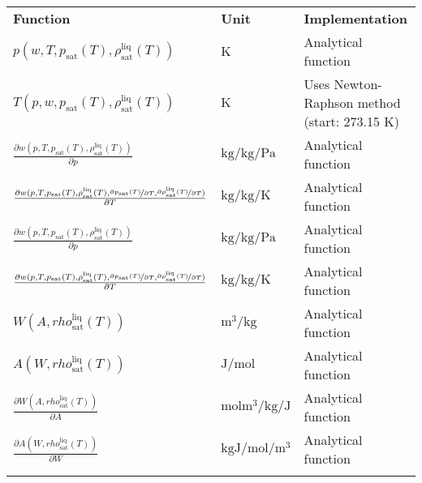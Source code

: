 \begin{longtable}[l]{l|l|p{4cm}}
	\toprule
	\addlinespace
	\textbf{Function} & \textbf{Unit} &	\textbf{Implementation} \\
	\addlinespace
	\midrule
	\endhead
	
	\bottomrule
	\endfoot
	\bottomrule
	\endlastfoot
	\addlinespace
	
	$p(w,T,p_\mathrm{sat}(T),\rho_\mathrm{sat}^\mathrm{liq}(T))$	& $\si{\kelvin}$ & Analytical function\\
	$T(p,w,p_\mathrm{sat}(T),\rho_\mathrm{sat}^\mathrm{liq}(T))$	& $\si{\kelvin}$ & Uses Newton-Raphson method (start: 273.15 K) \\
	$\frac{\partial w(p,T,p_\mathrm{sat}(T),\rho_\mathrm{sat}^\mathrm{liq}(T))}{\partial p}$	& $\si{\kilogram\per\kilogram\per\pascal}$ & Analytical function\\
	$\frac{\partial w(p,T,p_\mathrm{sat}(T),\rho_\mathrm{sat}^\mathrm{liq}(T),\nicefrac{\partial p_\mathrm{sat}(T)}{\partial T},\nicefrac{\partial \rho_\mathrm{sat}^\mathrm{liq}(T)}{\partial T})}{\partial T}$	& $\si{\kilogram\per\kilogram\per\kelvin}$ & Analytical function\\
	$\frac{\partial w(p,T,p_\mathrm{sat}(T),\rho_\mathrm{sat}^\mathrm{liq}(T))}{\partial p}$	& $\si{\kilogram\per\kilogram\per\pascal}$ & Analytical function\\
	$\frac{\partial w(p,T,p_\mathrm{sat}(T),\rho_\mathrm{sat}^\mathrm{liq}(T),\nicefrac{\partial p_\mathrm{sat}(T)}{\partial T},\nicefrac{\partial \rho_\mathrm{sat}^\mathrm{liq}(T)}{\partial T})}{\partial T}$	& $\si{\kilogram\per\kilogram\per\kelvin}$ & Analytical function\\
	$W(A,rho_\mathrm{sat}^\mathrm{liq}(T))$ & $\si{\cubic\meter\per\kilogram}$ & Analytical function \\
	$A(W,rho_\mathrm{sat}^\mathrm{liq}(T))$ & $\si{\joule\per\mole}$ & Analytical function \\
	$\frac{\partial W(A,rho_\mathrm{sat}^\mathrm{liq}(T))}{\partial A}$ & $\si{\mole\cubic\meter\per\kilogram\per\joule}$ & Analytical function \\
	$\frac{\partial A(W,rho_\mathrm{sat}^\mathrm{liq}(T))}{\partial W}$ & $\si{\kilogram\joule\per\mole\per\cubic\meter}$ & Analytical function \\
	
	\addlinespace
\end{longtable}
%

